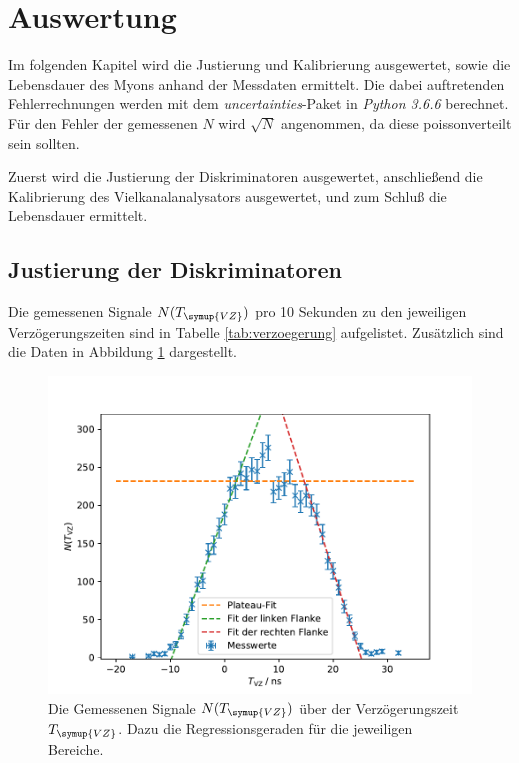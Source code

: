 \section{Auswertung}
\label{sec:Auswertung}

Im folgenden Kapitel wird die Justierung und Kalibrierung ausgewertet, sowie die
Lebensdauer des Myons anhand der Messdaten ermittelt. Die dabei auftretenden Fehlerrechnungen
werden mit dem \textit{uncertainties}-Paket in \textit{Python 3.6.6} berechnet. Für den Fehler der gemessenen $N$ wird
$\sqrt{N}$ angenommen, da diese poissonverteilt sein sollten.

\noindent
Zuerst wird die Justierung der Diskriminatoren ausgewertet, anschließend die
Kalibrierung des Vielkanalanalysators ausgewertet, und zum Schluß die Lebensdauer
ermittelt.

\subsection{Justierung der Diskriminatoren}
\label{sec:Verzögerungszeit}

Die gemessenen Signale $N(T_{\symup{VZ}})$ pro 10 Sekunden zu den jeweiligen Verzögerungszeiten sind in
Tabelle \ref{tab:verzoegerung} aufgelistet. Zusätzlich sind die Daten in Abbildung \ref{fig:verzoegerung}
dargestellt.

\begin{figure}[h]
  \centering
  \includegraphics{verzoegerungregression.pdf}
  \caption{Die Gemessenen Signale $N(T_{\symup{VZ}})$ über der Verzögerungszeit $T_{\symup{VZ}}$. Dazu die Regressionsgeraden für die jeweiligen Bereiche.}
  \label{fig:verzoegerung}
\end{figure}

